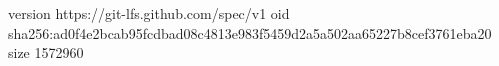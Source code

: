 version https://git-lfs.github.com/spec/v1
oid sha256:ad0f4e2bcab95fcdbad08c4813e983f5459d2a5a502aa65227b8cef3761eba20
size 1572960
